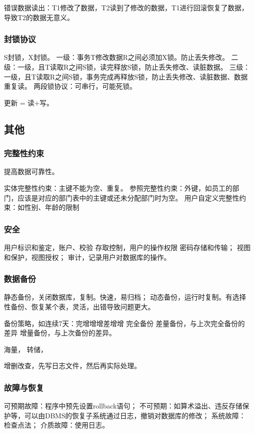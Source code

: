 \documentclass[UTF8]{article}
\begin{document}
错误数据读出：T1修改了数据，T2读到了修改的数据，T1进行回滚恢复了数据，导致T2的数据无意义。

\subsubsection{封锁协议}
S封锁，X封锁。
一级：事务T修改数据R之间必须加X锁。防止丢失修改。
二级：一级，且T读取R之间S锁，读完释放S锁，防止丢失修改、读脏数据。
三级：一级，且T读取R之间S锁，事务完成再释放S锁，防止丢失修改、读脏数据、数据重复读。
两段锁协议：可串行，可能死锁。

更新 = 读+写。

\subsection{其他}
\subsubsection{完整性约束}
提高数据可靠性。

实体完整性约束：主键不能为空、重复。
参照完整性约束：外键，如员工的部门，应该是对应的部门表中的主键或还未分配部门时为空。
用户自定义完整性约束：如性别、年龄的限制

\subsubsection{安全}
用户标识和鉴定，账户、校验
存取控制，用户的操作权限
密码存储和传输；
视图和保护，视图授权；
审计，记录用户对数据库的操作。

\subsubsection{数据备份}
静态备份，关闭数据库，复制。快速，易归档；
动态备份，运行时复制。有选择性备份、恢复某个表，灵活，出错导致问题更大。

备份策略，如连续7天：完增增增差增增
完全备份
差量备份，与上次完全备份的差异
增量备份，与上次备份的差异。


海量，
转储，

增删改查，先写日志文件，然后再实际处理。

\subsubsection{故障与恢复}
可预期故障：程序中预先设置rollback语句；
不可预期：如算术溢出、违反存储保护等，可以由DBMS的恢复子系统通过日志，撤销对数据库的修改；
系统故障：检查点法；
介质故障：使用日志。
\end{document}
